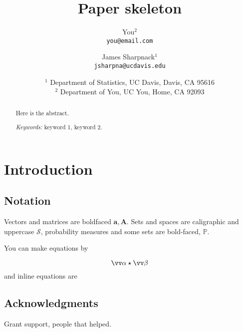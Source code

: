 \documentclass[twoside,11pt]{article}
\newcommand{\pp}{\mathbb} %
\newcommand{\cc}{\mathcal} %
\def\beq{\begin{equation}} %
\def\eeq{\end{equation}}
\newcommand{\teq}[1]{\smash{$#1$}}
\begin{document}
\title{Paper skeleton}
\author{
You$^{2}$\\
{\tt you@email.com}\\
\and
James Sharpnack$^{1}$ \\
{\tt  jsharpna@ucdavis.edu} \\
\and
\begin{tabular}{c}
  $^{1}$ Department of Statistics, UC Davis, Davis, CA 95616\\
  $^{2}$ Department of You, UC You, Home, CA 92093\\
\end{tabular}
}

\date{}%
\maketitle

\begin{abstract}
Here is the abstract.

\medskip\noindent
{\em Keywords:} keyword 1, keyword 2.
\end{abstract}


\section{Introduction}
\label{sec:intro}

\subsection{Notation}
Vectors and matrices are boldfaced $\bm a, \bm A$.
Sets and spaces are caligraphic and uppercase $\cc S$, probability measures and some sets are bold-faced, $\pp P$.

You can make equations by 

\beq 
\label{eq:eqname}
\vv \alpha \star \vv \beta
\eeq
and inline equations are \teq{\sum \alpha + \beta}


\subsection*{Acknowledgments}

Grant support, people that helped.



\end{document}
